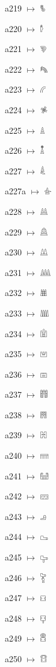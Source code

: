 {\noindent a219 $\mapsto$ {\ahfont 𔓼}\par
\noindent a220 $\mapsto$ {\ahfont 𔓽}\par
\noindent a221 $\mapsto$ {\ahfont 𔓾}\par
\noindent a222 $\mapsto$ {\ahfont 𔓿}\par
\noindent a223 $\mapsto$ {\ahfont 𔔀}\par
\noindent a224 $\mapsto$ {\ahfont 𔔁}\par
\noindent a225 $\mapsto$ {\ahfont 𔔂}\par
\noindent a226 $\mapsto$ {\ahfont 𔔃}\par
\noindent a227 $\mapsto$ {\ahfont 𔔄}\par
\noindent a227a $\mapsto$ {\ahfont 𔔅}\par
\noindent a228 $\mapsto$ {\ahfont 𔔆}\par
\noindent a229 $\mapsto$ {\ahfont 𔔇}\par
\noindent a230 $\mapsto$ {\ahfont 𔔈}\par
\noindent a231 $\mapsto$ {\ahfont 𔔉}\par
\noindent a232 $\mapsto$ {\ahfont 𔔊}\par
\noindent a233 $\mapsto$ {\ahfont 𔔋}\par
\noindent a234 $\mapsto$ {\ahfont 𔔌}\par
\noindent a235 $\mapsto$ {\ahfont 𔔍}\par
\noindent a236 $\mapsto$ {\ahfont 𔔎}\par
\noindent a237 $\mapsto$ {\ahfont 𔔏}\par
\noindent a238 $\mapsto$ {\ahfont 𔔐}\par
\noindent a239 $\mapsto$ {\ahfont 𔔑}\par
\noindent a240 $\mapsto$ {\ahfont 𔔒}\par
\noindent a241 $\mapsto$ {\ahfont 𔔓}\par
\noindent a242 $\mapsto$ {\ahfont 𔔔}\par
\noindent a243 $\mapsto$ {\ahfont 𔔕}\par
\noindent a244 $\mapsto$ {\ahfont 𔔖}\par
\noindent a245 $\mapsto$ {\ahfont 𔔗}\par
\noindent a246 $\mapsto$ {\ahfont 𔔘}\par
\noindent a247 $\mapsto$ {\ahfont 𔔙}\par
\noindent a248 $\mapsto$ {\ahfont 𔔚}\par
\noindent a249 $\mapsto$ {\ahfont 𔔛}\par
\noindent a250 $\mapsto$ {\ahfont 𔔜}\par
}
